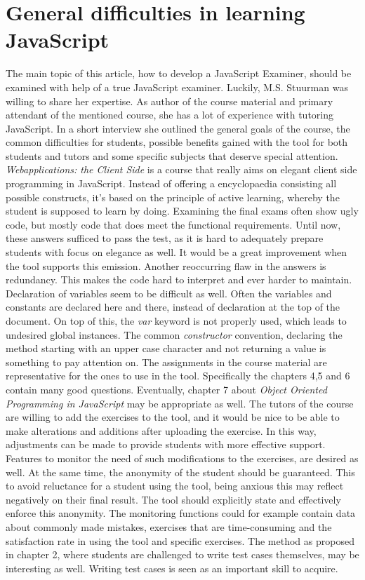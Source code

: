 \documentclass{article}
\begin{document}
\section{General difficulties in learning JavaScript} 
The main topic of this article, how to develop a JavaScript Examiner, should be 
examined with help of a true JavaScript examiner. Luckily, M.S. Stuurman was
willing to share her expertise. As author of the
course material and primary attendant of the mentioned course, she has a lot of
experience with tutoring JavaScript.  In a short interview she outlined the
general goals of the course, the common difficulties for students, possible 
benefits gained with the tool for both students and tutors and some specific 
subjects that deserve special attention.\newline
{\em Webapplications: the Client Side} is a course that really aims on elegant 
client side programming in JavaScript. Instead of offering a encyclopaedia
consisting all possible constructs, it's based on the principle of active
learning, whereby the student is supposed to learn by doing. \newline
Examining the final exams often show ugly code, but mostly code that does meet 
the functional requirements. Until now, these answers sufficed to pass the test,
as it is hard to adequately prepare students with focus on elegance as well. It
would be a great improvement when the tool supports this emission. Another 
reoccurring flaw in the answers is redundancy. This makes the code hard
to interpret and ever harder to maintain. Declaration of variables seem to be
difficult as well. Often the variables and constants are declared here and 
there, instead of
declaration at the top of the document. On top of this, the {\em var} keyword 
is not properly used, which leads to undesired global instances. The common
{\em constructor} convention, declaring the method starting with an upper case
character and not returning a value is something to pay attention on. \newline
The assignments in the course material are representative for the ones to use 
in the tool. Specifically the chapters 4,5 and 6 contain many good questions. 
Eventually, chapter 7 about {\em Object Oriented Programming in JavaScript} may
be appropriate as well. 
The tutors of the course are willing to add the exercises to the tool, and it 
would be nice to be able to make alterations and additions after uploading the 
exercise. In this way, adjustments can be made to provide students with more
effective support. Features to monitor the need of such modifications to the 
exercises, are desired as well. At the same time, the anonymity of the student
should be guaranteed. This to avoid reluctance for a student using the tool, 
being anxious this may reflect negatively on their final result. The tool should
explicitly state and effectively enforce this anonymity. The monitoring
functions could for example contain data about commonly made mistakes,
exercises that are time-consuming and the satisfaction rate in using the tool
and specific exercises. The method as proposed in chapter 2, where students are
challenged to write test cases themselves, may be interesting as well. Writing
test cases is seen as an important skill to acquire. 
\end{document}
